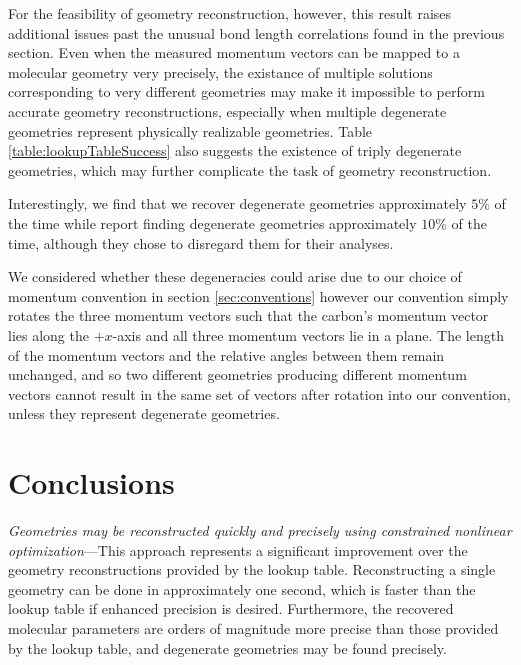 For the feasibility of geometry reconstruction, however, this result raises additional issues past the unusual bond length correlations found in the previous section. Even when the measured momentum vectors can be mapped to a molecular geometry very precisely, the existance of multiple solutions corresponding to very different geometries may make it impossible to perform accurate geometry reconstructions, especially when multiple degenerate geometries represent physically realizable geometries. Table \ref{table:lookupTableSuccess} also suggests the existence of triply degenerate geometries, which may further complicate the task of geometry reconstruction.

Interestingly, we find that we recover degenerate geometries approximately $5\%$ of the time while \citet[supplementary information]{Kunitski15} report finding degenerate geometries approximately $10\%$ of the time, although they chose to disregard them for their analyses.

We considered whether these degeneracies could arise due to our choice of momentum convention in section \ref{sec:conventions} however our convention simply rotates the three momentum vectors such that the carbon's momentum vector lies along the $+x$-axis and all three momentum vectors lie in a plane. The length of the momentum vectors and the relative angles between them remain unchanged, and so two different geometries producing different momentum vectors cannot result in the same set of vectors after rotation into our convention, unless they represent degenerate geometries.

\section{Conclusions}
\emph{Geometries may be reconstructed quickly and precisely using constrained nonlinear optimization}---This approach represents a significant improvement over the geometry reconstructions provided by the lookup table. Reconstructing a single geometry can be done in approximately one second, which is faster than the lookup table if enhanced precision is desired. Furthermore, the recovered molecular parameters are orders of magnitude more precise than those provided by the lookup table, and degenerate geometries may be found precisely.

%
%
%
